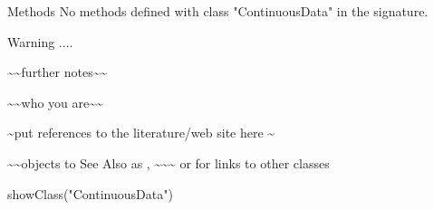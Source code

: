 \begin{Section}{Methods}
No methods defined with class "ContinuousData" in the signature.
\end{Section}
\begin{Section}{Warning}
....
\end{Section}
\begin{Note}\relax
\textasciitilde{}\textasciitilde{}further notes\textasciitilde{}\textasciitilde{}
\end{Note}
\begin{Author}\relax
\textasciitilde{}\textasciitilde{}who you are\textasciitilde{}\textasciitilde{}
\end{Author}
\begin{References}\relax
\textasciitilde{}put references to the literature/web site here \textasciitilde{}
\end{References}
\begin{SeeAlso}\relax
\textasciitilde{}\textasciitilde{}objects to See Also as , \textasciitilde{}\textasciitilde{}\textasciitilde{}
or  for links to other classes
\end{SeeAlso}
\begin{Examples}
\begin{ExampleCode}
showClass("ContinuousData")
\end{ExampleCode}
\end{Examples}


